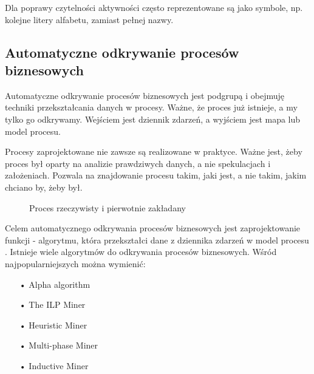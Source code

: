 Dla poprawy czytelności aktywności często reprezentowane są jako symbole, np. kolejne litery alfabetu, zamiast pełnej nazwy.

\subsection{Automatyczne odkrywanie procesów biznesowych}
\label{sec:discovery}

Automatyczne odkrywanie procesów biznesowych jest podgrupą i obejmuję techniki przekształcania danych w procesy. Ważne, że proces już istnieje, a my tylko go odkrywamy. Wejściem jest dziennik zdarzeń, a wyjściem jest mapa lub model procesu.

Procesy zaprojektowane nie zawsze są realizowane w praktyce. Ważne jest, żeby proces był oparty na analizie prawdziwych danych, a nie spekulacjach i założeniach. Pozwala na znajdowanie procesu takim, jaki jest, a nie takim, jakim chciano by, żeby był.

\begin{figure}[h]
	\caption{\label{fig:subcaption_example}Proces rzeczywisty i pierwotnie zakładany}
\end{figure}

Celem automatycznego odkrywania procesów biznesowych jest zaprojektowanie funkcji - algorytmu, która przekształci dane z dziennika zdarzeń w model procesu \cite{pm-book}. Istnieje wiele algorytmów do odkrywania procesów biznesowych. Wśród najpopularniejszych można wymienić:
\begin{itemize}
  \item[•] Alpha algorithm \cite{alpha-algorithm}
  \item[•] The ILP Miner \cite{ILP-miner}
  \item[•] Heuristic Miner \cite{heuristics-miner}
  \item[•] Multi-phase Miner \cite{multi-phase-miner}
  \item[•] Inductive Miner \cite{inductive-miner}
\end{itemize}

